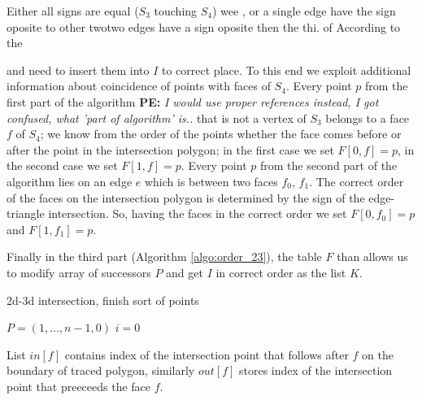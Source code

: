 \documentclass{elsarticle}
\def\abs#1{\left|#1\right|}
\def\abs#1{| #1 |}
\newcommand{\notePE}[1]{{\color{Orange} \textbf{PE: } \textit{#1}}}
\begin{document}
Either all signs are equal ($S_3$ touching $S_4$) wee , or
a single edge have the sign oposite to other twotwo edges have a sign oposite then the thi. of According to the 


and need to insert them into $I$ to correct place. To this end we exploit additional information about coincidence of points
with faces of $S_4$. Every point $p$ from the first part of the algorithm \notePE{I would use proper references instead, I got confused, what 'part of algorithm' is..} that is not a vertex of $S_3$ belongs to a face $f$ of $S_4$; we know from the order of the points
whether the face comes before or after the point in the intersection polygon; in the first case we set $F[0,f] =p$, in the second case we set $F[1,f]=p$. 
Every point $p$ from the second part of the algorithm lies on an edge $e$ which is between two faces $f_0$, $f_1$. The correct order of the faces on the 
intersection polygon is determined by the sign of the edge-triangle intersection. So, having the faces in the correct order we set $F[0,f_0]=p$ and $F[1, f_1]=p$.



Finally in the third part (Algorithm \ref{algo:order_23}), the table $F$ than allows us to modify array of successors $P$ and get $I$ in correct order as the list $K$.










\begin{algorithm}
  \caption{2d-3d intersection, finish sort of points}  
  \label{algo:order_23}
  
  \DontPrintSemicolon
  $P=(1,\dots, n-1,0)$
  $i=0$\;  
  \lFor{$n=0$ \To $\abs{I}-1$}{
    $K[n]=I[i]$
    $i=P[i]$
  }    
  \label{algo:order_23}
\end{algorithm}

  
 List $in[f]$ contains index of the intersection point that follows after $f$ on the boundary of traced polygon, 
 similarly $out[f]$ stores index of the intersection point that preeceeds the face $f$.
\end{document}
